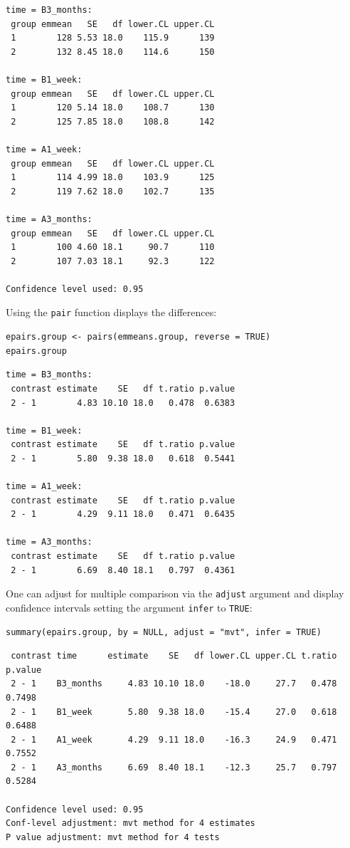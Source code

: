 \documentclass[12pt]{article}
\begin{document}
\begin{verbatim}
time = B3_months:
 group emmean   SE   df lower.CL upper.CL
 1        128 5.53 18.0    115.9      139
 2        132 8.45 18.0    114.6      150

time = B1_week:
 group emmean   SE   df lower.CL upper.CL
 1        120 5.14 18.0    108.7      130
 2        125 7.85 18.0    108.8      142

time = A1_week:
 group emmean   SE   df lower.CL upper.CL
 1        114 4.99 18.0    103.9      125
 2        119 7.62 18.0    102.7      135

time = A3_months:
 group emmean   SE   df lower.CL upper.CL
 1        100 4.60 18.1     90.7      110
 2        107 7.03 18.1     92.3      122

Confidence level used: 0.95
\end{verbatim}

\clearpage

Using the \texttt{pair} function displays the differences:
\lstset{language=r,label= ,caption= ,captionpos=b,numbers=none}
\begin{lstlisting}
epairs.group <- pairs(emmeans.group, reverse = TRUE)
epairs.group
\end{lstlisting}

\begin{verbatim}
time = B3_months:
 contrast estimate    SE   df t.ratio p.value
 2 - 1        4.83 10.10 18.0   0.478  0.6383

time = B1_week:
 contrast estimate    SE   df t.ratio p.value
 2 - 1        5.80  9.38 18.0   0.618  0.5441

time = A1_week:
 contrast estimate    SE   df t.ratio p.value
 2 - 1        4.29  9.11 18.0   0.471  0.6435

time = A3_months:
 contrast estimate    SE   df t.ratio p.value
 2 - 1        6.69  8.40 18.1   0.797  0.4361
\end{verbatim}

One can adjust for multiple comparison via the \texttt{adjust} argument and
display confidence intervals setting the argument \texttt{infer} to \texttt{TRUE}:
\lstset{language=r,label= ,caption= ,captionpos=b,numbers=none}
\begin{lstlisting}
summary(epairs.group, by = NULL, adjust = "mvt", infer = TRUE)
\end{lstlisting}

\begin{verbatim}
 contrast time      estimate    SE   df lower.CL upper.CL t.ratio p.value
 2 - 1    B3_months     4.83 10.10 18.0    -18.0     27.7   0.478  0.7498
 2 - 1    B1_week       5.80  9.38 18.0    -15.4     27.0   0.618  0.6488
 2 - 1    A1_week       4.29  9.11 18.0    -16.3     24.9   0.471  0.7552
 2 - 1    A3_months     6.69  8.40 18.1    -12.3     25.7   0.797  0.5284

Confidence level used: 0.95 
Conf-level adjustment: mvt method for 4 estimates 
P value adjustment: mvt method for 4 tests
\end{verbatim}
\end{document}

